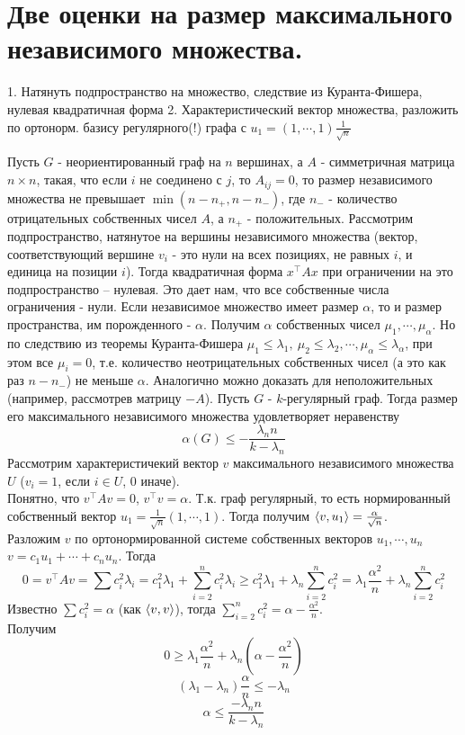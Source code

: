\section{
  Две оценки на размер максимального независимого множества.
}
    
    1. Натянуть подпространство на  множество, следствие из Куранта-Фишера, нулевая квадратичная форма
    2. Характеристический вектор множества, разложить по ортонорм. базису регулярного(!) графа с $u_1 = (1,\cdots,1) \frac{1}{\sqrt n}$
    
    
    \thrm Пусть $G$ - неориентированный граф на $n$ вершинах, а $A$ - симметричная матрица $n \times n$, такая, что если $i$ не соединено с $j$, то $A_{ij} = 0$, то размер независимого множества не превышает $\min(n - n_{+}, n-n_{-})$, где $n_{-}$ - количество отрицательных собственных чисел $A$, а $n_{+}$ - положительных.
    \ethrm
    \proof
    Рассмотрим подпространство, натянутое на вершины независимого множества (вектор, соответствующий вершине $v_i$ - это нули на всех позициях, не равных $i$, и единица на позиции $i$). Тогда квадратичная форма $x^{\top}Ax$ при ограничении на это подпространство -- нулевая. Это дает нам, что все собственные числа ограничения - нули. Если независимое множество имеет размер $\alpha$, то и размер пространства, им порожденного - $\alpha$. Получим $\alpha$ собственных чисел $\mu_1, \cdots, \mu_{\alpha}$. Но по следствию из теоремы Куранта-Фишера $\mu_1 \le \lambda_1,\: \mu_2 \le \lambda_2, \cdots,\mu_{\alpha} \le \lambda_{\alpha}$, при этом все $\mu_i = 0$, т.е. количество неотрицательных собственных чисел (а это как раз $n - n_{-}$) не меньше $\alpha$. Аналогично можно доказать для неположительных (например, рассмотрев матрицу $-A$).
    \endproof
    \thrm Пусть $G$ - $k$-регулярный граф. Тогда размер его максимального независимого множества удовлетворяет неравенству
    $$\alpha(G) \le - \frac{\lambda_n n}{k - \lambda_n}$$
    \ethrm
    \proof
        Рассмотрим характеристичекий вектор $v$ максимального независимого множества $U$ ($v_i = 1$, если $i \in U$, 0 иначе).\\
        Понятно, что $v^{\top}Av = 0$, $v^{\top}v = \alpha$. Т.к. граф регулярный, то есть нормированный собственный вектор $u_1 = \frac{1}{\sqrt{n}}(1,\cdots,1)$. Тогда получим $\left\langle v, u_1 \right\rangle = \frac{\alpha}{\sqrt n}$.\\
        Разложим $v$ по ортонормированной системе собственных векторов $u_1, \cdots, u_n$ $v = c_1 u_1 + \cdots + c_n u_n$. Тогда
        $$0 = v^{\top}Av = \sum c_i^2 \lambda_i = c_1^2 \lambda_1 + \sum\limits_{i=2}^{n} c_i^2 \lambda_i \ge c_1^2 \lambda_1 + \lambda_n \sum\limits_{i=2}^{n} c_i^2 = \lambda_1 \frac{\alpha^2}{n} +\lambda_n \sum\limits_{i=2}^n c_i^2$$
        Известно $\sum c_i^2 = \alpha$ (как $\left\langle v,v \right\rangle$), тогда $\sum\limits_{i=2}^{n} c_i^2 = \alpha - \frac{\alpha^2}{n}$.\\ Получим $$0 \ge \lambda_1 \frac{\alpha^2}{n} + \lambda_n\left(\alpha - \frac{\alpha^2}{n}\right)$$
         $$(\lambda_1 - \lambda_n)\frac{\alpha}{n} \le -\lambda_n$$
         $$\alpha \le \frac{-\lambda_n n}{k - \lambda_n}$$
        
    \endproof
